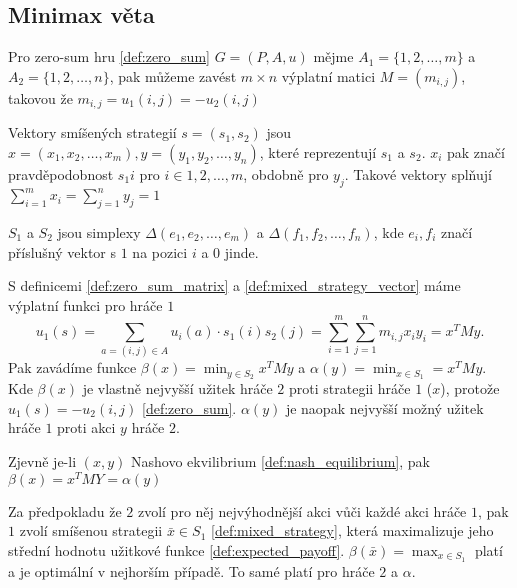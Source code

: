 \subsection{Minimax věta}
\begin{definition}
\label{def:zero_sum_matrix}
Pro zero-sum hru \ref{def:zero_sum} $G = (P, A, u)$ mějme $A_1 = \{1,2,\dots,m\}$ a $A_2 = \{1,2,\dots,n\}$, pak můžeme zavést $m \times n$ výplatní matici $M = (m_{i,j})$, takovou že $m_{i,j} = u_1(i,j) = -u_2(i,j)$
\end{definition}
\begin{definition}
\label{def:mixed_strategy_vector}
Vektory smíšených strategií $s =(s_1, s_2)$ jsou $x = (x_1, x_2, \dots, x_m), y = (y_1, y_2, \dots, y_n)$, které reprezentují $s_1$ a $s_2$. 
$x_i$ pak značí pravděpodobnost $s_1{i}$ pro $i \in {1,2,\dots,m}$, obdobně pro $y_j$. 
Takové vektory splňují $\sum_{i=1}^m  x_i = \sum_{j=1}^n  y_j = 1$

$S_1$ a $S_2$ jsou simplexy $\Delta(e_1, e_2, \dots, e_m)$ a $\Delta(f_1, f_2, \dots, f_n)$, kde $e_i, f_i$ značí příslušný vektor s $1$ na pozici $i$ a $0$ jinde.
\end{definition}
\begin{definition}
\label{def:beta_alpha}
S definicemi \ref{def:zero_sum_matrix} a \ref{def:mixed_strategy_vector} máme výplatní funkci pro hráče $1$
\[
    u_1(s) = \sum_{a = (i,j) \in A} u_i(a) \cdot s_1(i)s_2(j) = \sum^m_{i = 1} \sum^n_{j=1} m_{i,j} x_i y_i = x^T M y.
\]
Pak zavádíme funkce $\beta(x) = \min_{y \in S_2} x^T M y$ a $\alpha(y) = \min_{x\in S_1} = x^T M y$. 
Kde $\beta(x)$ je vlastně nejvyšší užitek hráče $2$ proti strategii hráče $1$ ($x$), protože $u_1(s) = -u_2(i,j)$ \ref{def:zero_sum}. 
$\alpha(y)$ je naopak nejvyšší možný užitek hráče $1$ proti akci $y$ hráče $2$. 

Zjevně je-li $(x,y)$ Nashovo ekvilibrium \ref{def:nash_equilibrium}, pak $\beta(x) = x^T M Y = \alpha(y)$
\end{definition}

Za předpokladu že $2$ zvolí pro něj nejvýhodnější akci vůči každé akci hráče $1$, pak $1$ zvolí smíšenou strategii $\bar{x} \in S_1$ \ref{def:mixed_strategy}, která maximalizuje jeho střední hodnotu užitkové funkce \ref{def:expected_payoff}. $\beta(\bar{x}) = \max_{x\in S_1}$ platí a je optimální v nejhorším případě. To samé platí pro hráče $2$ a $\alpha$. 


